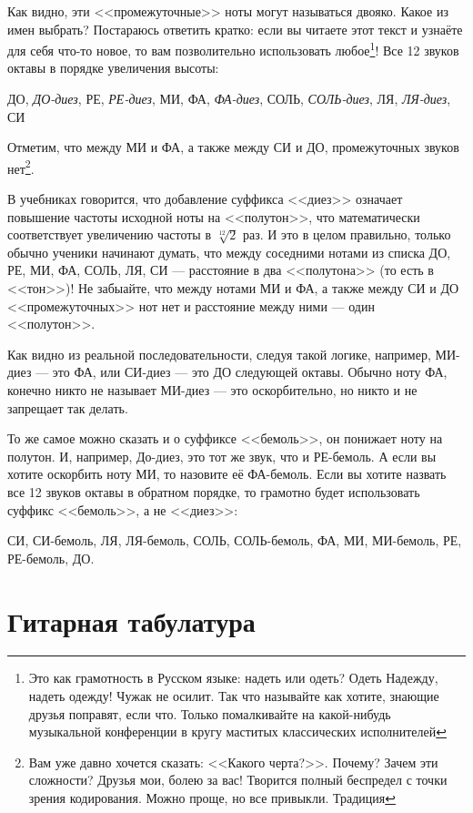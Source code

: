 Как видно, эти <<промежуточные>> ноты могут называться двояко. Какое из имен выбрать? Постараюсь ответить кратко: если вы читаете этот текст и узнаёте для себя что-то новое, то вам позволительно использовать любое\footnote{Это как грамотность в Русском языке: надеть или одеть? Одеть Надежду, надеть одежду! Чужак не осилит. Так что называйте как хотите, знающие друзья поправят, если что. Только помалкивайте на какой-нибудь музыкальной конференции в кругу маститых классических исполнителей}! Все 12 звуков октавы в порядке увеличения высоты:
\begin{center}
    ДО, \emph{ДО-диез}, РЕ, \emph{РЕ-диез}, МИ, ФА, \emph{ФА-диез}, СОЛЬ, \emph{СОЛЬ-диез}, ЛЯ, \emph{ЛЯ-диез}, СИ
\end{center}

Отметим, что между МИ и ФА, а также между СИ и ДО, промежуточных звуков нет\footnote{Вам уже давно хочется сказать: <<Какого черта?>>. Почему? Зачем эти сложности? Друзья мои, болею за вас! Творится полный беспредел с точки зрения кодирования. Можно проще, но все привыкли. Традиция}.

В учебниках говорится, что добавление суффикса <<диез>> означает повышение частоты исходной ноты на <<полутон>>, что математически соответствует увеличению частоты в $\sqrt[12]{2}$ раз. И это в целом правильно, только обычно ученики начинают думать, что между соседними нотами из списка ДО, РЕ, МИ, ФА, СОЛЬ, ЛЯ, СИ --- расстояние в два <<полутона>> (то есть в <<тон>>)! Не забыайте, что между нотами МИ и ФА, а также между СИ и ДО <<промежуточных>> нот нет и расстояние между ними --- один <<полутон>>. 

Как видно из реальной последовательности, следуя такой логике, например, МИ-диез --- это ФА, или СИ-диез --- это ДО следующей октавы. Обычно ноту ФА, конечно никто не называет МИ-диез --- это оскорбительно, но никто и не запрещает так делать. 

То же самое можно сказать и о суффиксе <<бемоль>>, он понижает ноту на полутон. И, например, До-диез, это тот же звук, что и РЕ-бемоль. А если вы хотите оскорбить ноту МИ, то назовите её ФА-бемоль. Если вы хотите назвать все 12 звуков октавы в обратном порядке, то грамотно будет использовать суффикс <<бемоль>>, а не <<диез>>:

\begin{center}
СИ, СИ-бемоль, ЛЯ, ЛЯ-бемоль, СОЛЬ, СОЛЬ-бемоль, ФА, МИ, МИ-бемоль, РЕ, РЕ-бемоль, ДО.
\end{center}

\section{Гитарная табулатура}



